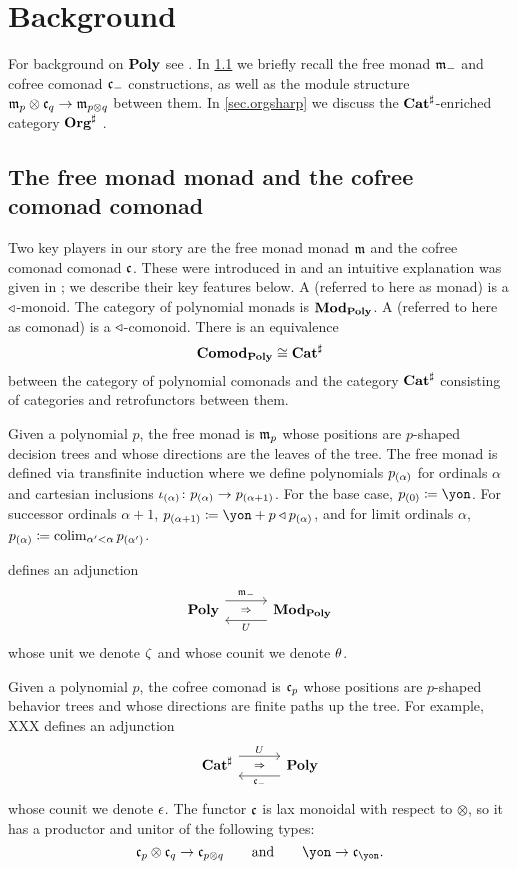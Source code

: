 \chapter{Background} \label{sec:background}

For background on $\mathbf{Poly}$ see \cite{**}. In \cref{sec.(co)free(co)monad} we briefly recall the free monad $\mathfrak{m}_-$ and cofree comonad $\mathfrak{c}_-$ constructions, as well as the module structure $\mathfrak{m}_p\otimes\mathfrak{c}_q\to\mathfrak{m}_{p\otimes q}$ between them. In \cref{sec.orgsharp} we discuss the $\mathbf{Cat}^\sharp$-enriched category $\mathbf{Org}^\sharp$ .


\section{The free monad monad and the cofree comonad comonad}\label{sec.(co)free(co)monad}

Two key players in our story are the free monad monad $\mathfrak{m}$ and the cofree comonad comonad $\mathfrak{c}$. These were introduced in \cite{Old stuff, maybe talk about Kelly?} and an intuitive explanation was given in \cite{libkind2024pattern}; we describe their key features below. A  (referred to here as monad) is a $\mathbin{\triangleleft}$-monoid. The category of polynomial monads is $\mathbf{Mod}_{\mathbf{Poly}}$. A  (referred to here as comonad) is a $\mathbin{\triangleleft}$-comonoid. There is an equivalence
\[
\mathbf{Comod}_{\mathbf{Poly}}\cong\mathbf{Cat}^\sharp
\]
between the category of polynomial comonads and the category $\mathbf{Cat}^\sharp$ consisting of categories and retrofunctors between them.\cite{XXX}

Given a polynomial $p$, the free monad is $\mathfrak{m}_p$ whose positions are $p$-shaped decision trees and whose directions are the leaves of the tree. The free monad is defined via transfinite induction where we define polynomials $p_{(\alpha)}$ for ordinals $\alpha$ and cartesian inclusions $\iota_{(\alpha)}\colon p_{(\alpha)} \to p_{(\alpha +1)}$. For the base case, $p\hoc{0} \coloneqq \yon$. For successor ordinals $\alpha + 1$, $p\hoc{\alpha + 1} \coloneqq \yon + p \tri p\hoc{\alpha}$, and for limit ordinals $\alpha$, $p_{(\alpha)} \coloneqq \operatorname*{colim}_{\alpha' < \alpha} p _{(\alpha')}$. 


\cite[Theorem 2.10]{libkind2024pattern} defines an adjunction
\[
    \adj{\poly}{\free_-}{U}{\modpoly}
\]
whose unit we denote $\zeta$ and whose counit we denote $\theta$.

Given a polynomial $p$, the cofree comonad is $\mathfrak{c}_p$ whose positions are $p$-shaped behavior trees and whose directions are finite paths up the tree. For example, XXX %
\cite[Theorem 3.2]{libkind2024pattern} defines an adjunction 
\[
    \adj{\catsharp}{U}{\cofree_-}{\poly}
\]
whose counit we denote $\epsilon$. The functor $\mathfrak{c}$ is lax monoidal with respect to $\otimes$, so it has a productor and unitor of the following types:
\[
\cofree_p\otimes\cofree_q\to\cofree_{p\otimes q}\qqand\yon\to\cofree_\yon.
\]

